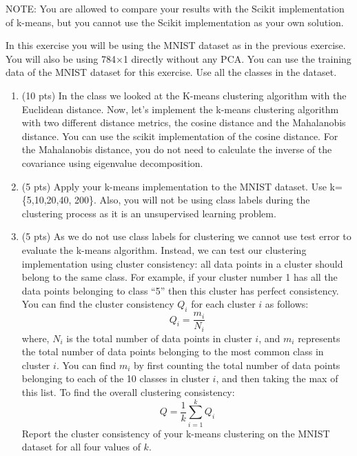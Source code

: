 \documentclass[10pt,letter,notitlepage]{article}
\newcommand{\red}[1]{{\color{red}#1}}
\newcounter{exercise}
\begin{document}
\begin{exercise}
\red{NOTE}: You are allowed to compare your results with the Scikit implementation of k-means, but you cannot use the Scikit implementation as your own solution.  

\noindent In this exercise you will be using the MNIST dataset as in the previous exercise. You will also be using 784$\times$1 directly without any PCA. You can use the training data of the MNIST dataset for this exercise. Use all the classes in the dataset. 

\begin{enumerate}
    \item (10 pts) In the class we looked at the K-means clustering algorithm with the Euclidean distance. Now, let's implement the k-means clustering algorithm with two different distance metrics, the cosine distance and the Mahalanobis distance. You can use the scikit implementation of the cosine distance. For the Mahalanobis distance, you do not need to calculate the inverse of the covariance using eigenvalue decomposition.  
    \item (5 pts) Apply your k-means implementation to the MNIST dataset. Use k=\{5,10,20,40, 200\}. Also, you will not be using class labels during the clustering process as it is an unsupervised learning problem. 
    \item (5 pts) As we do not use class labels for clustering we cannot use test error to evaluate the k-means algorithm. Instead, we can test our clustering implementation using cluster consistency: all data points in a cluster should belong to the same class. For example, if your cluster number 1 has all the data points belonging to class ``5'' then this cluster has perfect consistency. You can find the cluster consistency $Q_i$ for each cluster $i$ as follows:
    \begin{equation}
        Q_i = \frac{m_i}{N_i}
    \end{equation}
    where, $N_i$ is the total number of data points in cluster $i$, and $m_i$ represents the total number of data points belonging to the most common class in cluster $i$. You can find $m_i$ by first counting the total number of data points belonging to each of the 10 classes in cluster $i$, and then taking the max of this list. To find the overall clustering consistency:
    \begin{equation}
    Q = \frac{1}{k}\sum_{i=1}^{k} Q_i
    \end{equation}
    Report the cluster consistency of your k-means clustering on the MNIST dataset for all four values of $k$. 

\end{enumerate}
\end{exercise}
\end{document}
